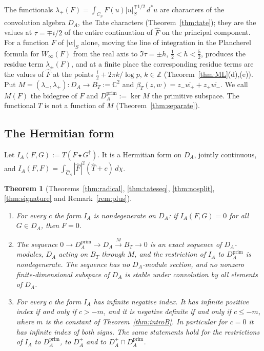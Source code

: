 \documentclass[11pt]{amsart}
\newtheorem{theorem}{Theorem}[section]
\theoremstyle{definition}
\theoremstyle{remark}
\newcommand{\C}{\mathbb C}
\newcommand{\Z}{\mathbb Z}
\newcommand{\dstar}{\,d^{*}}
\begin{document}
The functionals
$\lambda_{\mp}(F)=\int_{C_S}F(u)|u|_S^{\mp1/2}\dstar u$ are characters of the
convolution algebra $D_A$, the Tate characters (Theorem~\ref{thm:tate}); they
are the values at $\tau=\mp i/2$ of the entire continuation of $\widehat F$
on the principal component.  For a function $F$ of $|w|_S$ alone, moving the
line of integration in the Plancherel formula for $W_{\infty}(F)$ from the
real axis to $\Im\tau=\pm h$, $\tfrac12<h<\tfrac52$, produces the residue
term $\lambda_{\pm}(F)$, and at a finite place the corresponding residue
terms are the values of $\widehat F$ at the points
$\tfrac i2+2\pi k/\log p$, $k\in\Z$ (Theorem~\ref{thm:ML}(d),(e)).  Put
$M=(\lambda_-,\lambda_+):D_A\to B_T:=\C^{2}$ and
$\beta_T(z,w)=z_-\overline{w_+}+z_+\overline{w_-}$.  We call $M(F)$ the
bidegree of $F$ and $D_A^{\mathrm{prim}}:=\ker M$ the primitive subspace.  The
functional $T$ is not a function of $M$ (Theorem~\ref{thm:separate}).

\subsection*{The Hermitian form}

Let $I_A(F,G):=T(F\star G^{\dagger})$.  It is a Hermitian form on $D_A$,
jointly continuous, and
$I_A(F,F)=\int_{\widehat C_S}|\widehat F|^{2}(\widehat T+c)\,d\chi$.

\begin{theorem}[Theorems~\ref{thm:radical}, \ref{thm:tateseq},
\ref{thm:nosplit}, \ref{thm:signature} and Remark~\ref{rem:plus}]\label{thm:introC}
\begin{enumerate}
\item[(i)] For every $c$ the form $I_A$ is nondegenerate on $D_A$: if
$I_A(F,G)=0$ for all $G\in D_A$, then $F=0$.
\item[(ii)] The sequence
$0\to D_A^{\mathrm{prim}}\to D_A\stackrel{M}{\to}B_T\to0$ is an exact sequence
of $D_A$-modules, $D_A$ acting on $B_T$ through $M$, and the restriction of
$I_A$ to $D_A^{\mathrm{prim}}$ is nondegenerate.  The sequence has no
$D_A$-module section, and no nonzero finite-dimensional subspace of $D_A$ is
stable under convolution by all elements of $D_A$.
\item[(iii)] For every $c$ the form $I_A$ has infinite negative index.  It has
infinite positive index if and only if $c>-m$, and it is negative definite if
and only if $c\le-m$, where $m$ is the constant of
Theorem~\ref{thm:introB}.  In particular for $c=0$ it has infinite index of
both signs.  The same statements hold for the restrictions of $I_A$ to
$D_A^{\mathrm{prim}}$, to $D_A^{+}$ and to $D_A^{+}\cap D_A^{\mathrm{prim}}$.
\end{enumerate}
\end{theorem}
\end{document}
